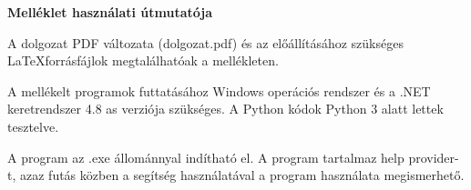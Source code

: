 \pagestyle{empty}

\noindent \textbf{\Large Melléklet használati útmutatója}

\vskip 1cm

A dolgozat PDF változata (dolgozat.pdf) és az előállításához szükséges \LaTeX forrásfájlok megtalálhatóak a mellékleten. 

A mellékelt programok futtatásához Windows operációs rendszer és a .NET keretrendszer 4.8 as verziója szükséges. A Python kódok Python 3 alatt lettek tesztelve. 

A program az .exe állománnyal indítható el. A program tartalmaz help provider-t, azaz futás közben a segítség használatával a program használata megismerhető. 